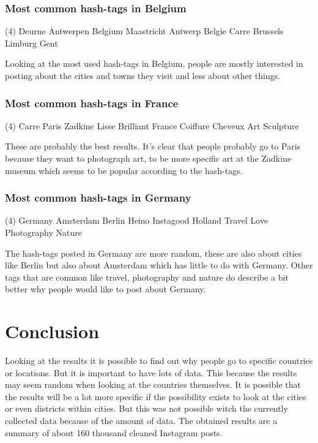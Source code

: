 \documentclass{article}
\begin{document}
\subsubsection{Most common hash-tags in Belgium}
\begin{tasks}[counter-format={tsk[1].}, label-align=left, label-offset={0mm}, label-width={5mm}, item-indent={5mm}, label-format={\bfseries}, column-sep=10mm](4)
\task Deurne
\task Antwerpen
\task Belgium
\task Maastricht
\task Antwerp
\task Belgie
\task Carre
\task Brussels
\task Limburg
\task Gent
\end{tasks}
Looking at the most used hash-tags in Belgium, people are mostly interested in posting about the cities and towns they visit and less about other things.


\subsubsection{Most common hash-tags in France}
\begin{tasks}[counter-format={tsk[1].}, label-align=left, label-offset={0mm}, label-width={5mm}, item-indent={5mm}, label-format={\bfseries}, column-sep=10mm](4)
\task Carre
\task Paris
\task Zadkine
\task Lisse
\task Brilliant
\task France
\task Coiffure
\task Cheveux
\task Art
\task Sculpture
\end{tasks}
These are probably the best results. It's clear that people probably go to Paris because they want to photograph art, to be more specific art at the Zadkine museum which seems to be popular according to the hash-tags.


\subsubsection{Most common hash-tags in Germany}
\begin{tasks}[counter-format={tsk[1].}, label-align=left, label-offset={0mm}, label-width={5mm}, item-indent={5mm}, label-format={\bfseries}, column-sep=10mm](4)
\task Germany
\task Amsterdam
\task Berlin
\task Heino
\task Instagood
\task Holland
\task Travel
\task Love
\task Photography
\task Nature
\end{tasks}
The hash-tags posted in Germany are more random, these are also about cities like Berlin but also about Amsterdam which has little to do with Germany. Other tags that are common like travel, photography and nature do describe a bit better why people would like to post about Germany.

\section{Conclusion}
Looking at the results it is possible to find out why people go to specific countries or locations. But it is important to have lots of data. This because the results may seem random when looking at the countries themselves. It is possible that the results will be a lot more specific if the possibility exists to look at the cities or even districts within cities. But this was not possible witch the currently collected data because of the amount of data. The obtained results are a summary of about 160 thousand cleaned Instagram posts.

\pagebreak
\printglossary[type=\acronymtype,title=\section{Abbreviations}]
\end{document}

